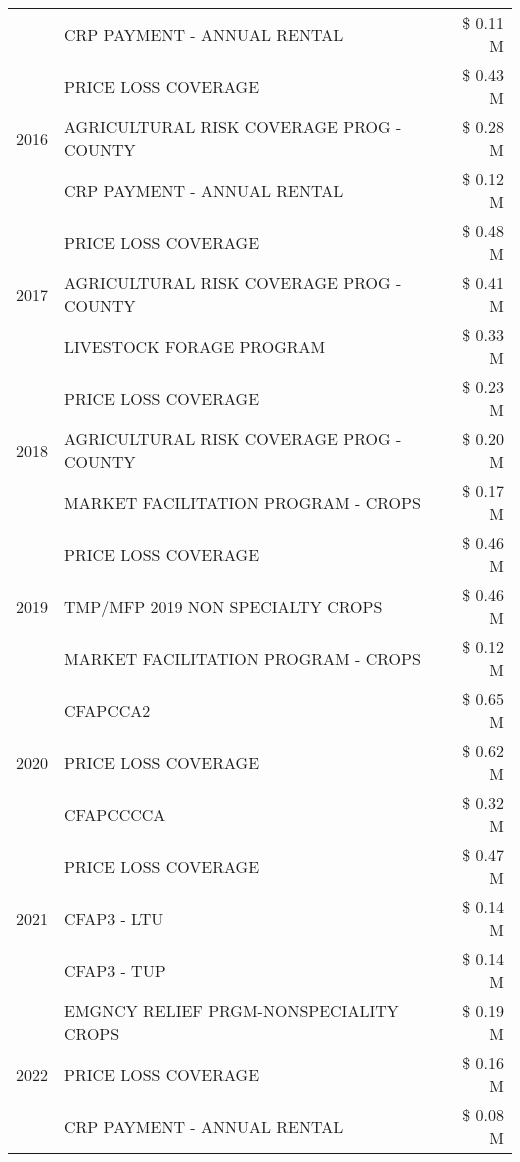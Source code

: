 \begin{tabular}{llr}
 & CRP PAYMENT - ANNUAL RENTAL & \$ 0.11 M \\
\cline{1-3}
\multirow[t]{3}{*}{2016} & PRICE LOSS COVERAGE & \$ 0.43 M \\
 & AGRICULTURAL RISK COVERAGE PROG - COUNTY & \$ 0.28 M \\
 & CRP PAYMENT - ANNUAL RENTAL & \$ 0.12 M \\
\cline{1-3}
\multirow[t]{3}{*}{2017} & PRICE LOSS COVERAGE & \$ 0.48 M \\
 & AGRICULTURAL RISK COVERAGE PROG - COUNTY & \$ 0.41 M \\
 & LIVESTOCK FORAGE PROGRAM & \$ 0.33 M \\
\cline{1-3}
\multirow[t]{3}{*}{2018} & PRICE LOSS COVERAGE & \$ 0.23 M \\
 & AGRICULTURAL RISK COVERAGE PROG - COUNTY & \$ 0.20 M \\
 & MARKET FACILITATION PROGRAM - CROPS & \$ 0.17 M \\
\cline{1-3}
\multirow[t]{3}{*}{2019} & PRICE LOSS COVERAGE & \$ 0.46 M \\
 & TMP/MFP 2019 NON SPECIALTY CROPS & \$ 0.46 M \\
 & MARKET FACILITATION PROGRAM - CROPS & \$ 0.12 M \\
\cline{1-3}
\multirow[t]{3}{*}{2020} & CFAPCCA2 & \$ 0.65 M \\
 & PRICE LOSS COVERAGE & \$ 0.62 M \\
 & CFAPCCCCA & \$ 0.32 M \\
\cline{1-3}
\multirow[t]{3}{*}{2021} & PRICE LOSS COVERAGE & \$ 0.47 M \\
 & CFAP3 - LTU & \$ 0.14 M \\
 & CFAP3 - TUP & \$ 0.14 M \\
\cline{1-3}
\multirow[t]{3}{*}{2022} & EMGNCY RELIEF PRGM-NONSPECIALITY CROPS & \$ 0.19 M \\
 & PRICE LOSS COVERAGE & \$ 0.16 M \\
 & CRP PAYMENT - ANNUAL RENTAL & \$ 0.08 M \\
\cline{1-3}
\bottomrule
\end{tabular}
